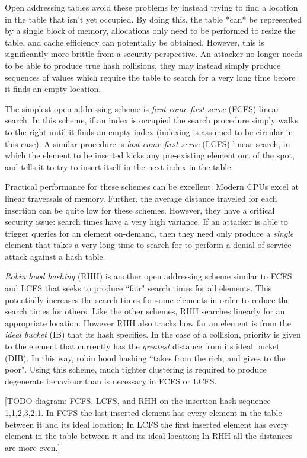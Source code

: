 \documentclass{cccg13}
\begin{document}
Open addressing tables avoid these problems by instead trying to find a location in the table that isn't yet occupied. By doing this, the table *can* be represented by a single block of memory, allocations only need to be performed to resize the table, and cache efficiency can potentially be obtained. However, this is significantly more brittle from a security perspective. An attacker no longer needs to be able to produce true hash collisions, they may instead simply produce sequences of values which require the table to search for a very long time before it finds an empty location.

The simplest open addressing scheme is \emph{first-come-first-serve} (FCFS) linear search. In this scheme, if an index is occupied the search procedure simply walks to the right until it finds an empty index (indexing is assumed to be circular in this case). A similar procedure is \emph{last-come-first-serve} (LCFS) linear search, in which the element to be inserted kicks any pre-existing element out of the spot, and tells it to try to insert itself in the next index in the table.

Practical performance for these schemes can be excellent. Modern CPUs excel at linear traversals of memory. Further, the average distance traveled for each insertion can be quite low for these schemes. However, they have a critical security issue: search times have a very high variance. If an attacker is able to trigger queries for an element on-demand, then they need only produce a \emph{single} element that takes a very long time to search for to perform a denial of service attack against a hash table.

\emph{Robin hood hashing} (RHH) is another open addressing scheme similar to FCFS and LCFS that seeks to produce ``fair" search times for all elements. This potentially increases the search times for some elements in order to reduce the search times for others. Like the other schemes, RHH searches linearly for an appropriate location. However RHH also tracks how far an element is from the \emph{ideal bucket} (IB) that its hash specifies. In the case of a collision, priority is given to the element that currently has the \emph{greatest} distance from its ideal bucket (DIB). In this way, robin hood hashing ``takes from the rich, and gives to the poor". Using this scheme, much tighter clustering is required to produce degenerate behaviour than is necessary in FCFS or LCFS.

[TODO diagram: FCFS, LCFS, and RHH on the insertion hash sequence 1,1,2,3,2,1. In FCFS the last inserted element has every element in the table between it and its ideal location; In LCFS the first inserted element has every element in the table between it and its ideal location; In RHH all the distances are more even.]
\end{document}
